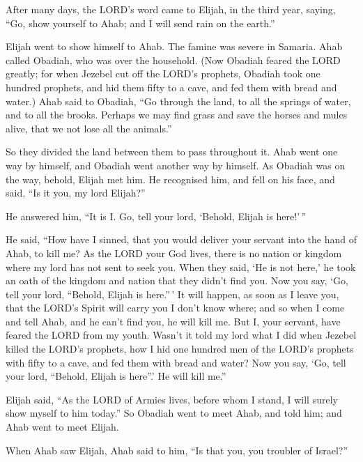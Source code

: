  After many days, the LORD's word came to Elijah, in the
third year, saying, ``Go, show yourself to Ahab; and I will send rain on
the earth.''

 Elijah went to show himself to Ahab. The famine was
severe in Samaria.  Ahab called Obadiah, who was over the
household. (Now Obadiah feared the LORD greatly;  for when
Jezebel cut off the LORD's prophets, Obadiah took one hundred prophets,
and hid them fifty to a cave, and fed them with bread and water.)
 Ahab said to Obadiah, ``Go through the land, to all the
springs of water, and to all the brooks. Perhaps we may find grass and
save the horses and mules alive, that we not lose all the animals.''

 So they divided the land between them to pass throughout
it. Ahab went one way by himself, and Obadiah went another way by
himself.  As Obadiah was on the way, behold, Elijah met
him. He recognised him, and fell on his face, and said, ``Is it you, my
lord Elijah?''

 He answered him, ``It is I. Go, tell your lord, `Behold,
Elijah is here!'\,''

 He said, ``How have I sinned, that you would deliver your
servant into the hand of Ahab, to kill me?  As the LORD
your God lives, there is no nation or kingdom where my lord has not sent
to seek you. When they said, `He is not here,' he took an oath of the
kingdom and nation that they didn't find you.  Now you
say, `Go, tell your lord, ``Behold, Elijah is here.''\,' 
It will happen, as soon as I leave you, that the LORD's Spirit will
carry you I don't know where; and so when I come and tell Ahab, and he
can't find you, he will kill me. But I, your servant, have feared the
LORD from my youth.  Wasn't it told my lord what I did
when Jezebel killed the LORD's prophets, how I hid one hundred men of
the LORD's prophets with fifty to a cave, and fed them with bread and
water?  Now you say, `Go, tell your lord, ``Behold,
Elijah is here''.' He will kill me.''

 Elijah said, ``As the LORD of Armies lives, before whom
I stand, I will surely show myself to him today.''  So
Obadiah went to meet Ahab, and told him; and Ahab went to meet Elijah.

 When Ahab saw Elijah, Ahab said to him, ``Is that you,
you troubler of Israel?''

